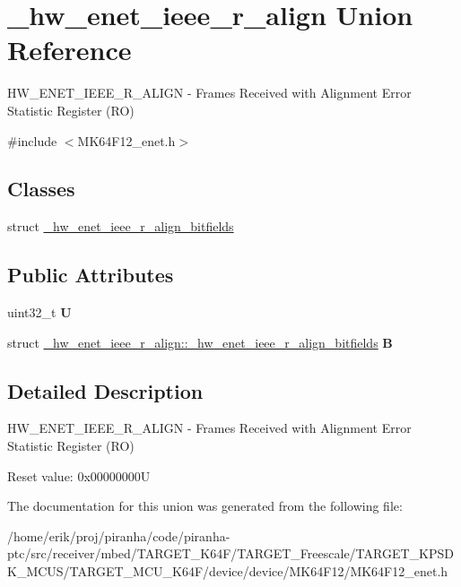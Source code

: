 \hypertarget{union__hw__enet__ieee__r__align}{}\section{\+\_\+hw\+\_\+enet\+\_\+ieee\+\_\+r\+\_\+align Union Reference}
\label{union__hw__enet__ieee__r__align}


H\+W\+\_\+\+E\+N\+E\+T\+\_\+\+I\+E\+E\+E\+\_\+\+R\+\_\+\+A\+L\+I\+GN -\/ Frames Received with Alignment Error Statistic Register (RO)  




{\ttfamily \#include $<$M\+K64\+F12\+\_\+enet.\+h$>$}

\subsection*{Classes}
\begin{DoxyCompactItemize}
\item 
struct \hyperlink{struct__hw__enet__ieee__r__align_1_1__hw__enet__ieee__r__align__bitfields}{\+\_\+hw\+\_\+enet\+\_\+ieee\+\_\+r\+\_\+align\+\_\+bitfields}
\end{DoxyCompactItemize}
\subsection*{Public Attributes}
\begin{DoxyCompactItemize}
\item 
uint32\+\_\+t {\bfseries U}\hypertarget{union__hw__enet__ieee__r__align_ade6e6359887c3af38e58780a09ba6498}{}\label{union__hw__enet__ieee__r__align_ade6e6359887c3af38e58780a09ba6498}

\item 
struct \hyperlink{struct__hw__enet__ieee__r__align_1_1__hw__enet__ieee__r__align__bitfields}{\+\_\+hw\+\_\+enet\+\_\+ieee\+\_\+r\+\_\+align\+::\+\_\+hw\+\_\+enet\+\_\+ieee\+\_\+r\+\_\+align\+\_\+bitfields} {\bfseries B}\hypertarget{union__hw__enet__ieee__r__align_afddc95ed141d8109623b1eb315c36ca8}{}\label{union__hw__enet__ieee__r__align_afddc95ed141d8109623b1eb315c36ca8}

\end{DoxyCompactItemize}


\subsection{Detailed Description}
H\+W\+\_\+\+E\+N\+E\+T\+\_\+\+I\+E\+E\+E\+\_\+\+R\+\_\+\+A\+L\+I\+GN -\/ Frames Received with Alignment Error Statistic Register (RO) 

Reset value\+: 0x00000000U 

The documentation for this union was generated from the following file\+:\begin{DoxyCompactItemize}
\item 
/home/erik/proj/piranha/code/piranha-\/ptc/src/receiver/mbed/\+T\+A\+R\+G\+E\+T\+\_\+\+K64\+F/\+T\+A\+R\+G\+E\+T\+\_\+\+Freescale/\+T\+A\+R\+G\+E\+T\+\_\+\+K\+P\+S\+D\+K\+\_\+\+M\+C\+U\+S/\+T\+A\+R\+G\+E\+T\+\_\+\+M\+C\+U\+\_\+\+K64\+F/device/device/\+M\+K64\+F12/M\+K64\+F12\+\_\+enet.\+h\end{DoxyCompactItemize}
